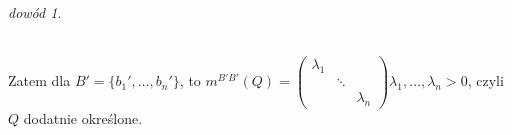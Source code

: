 \documentclass[10pt]{article}
\theoremstyle{definition}
\theoremstyle{definition}
\theoremstyle{definition}
\theoremstyle{definition}
\theoremstyle{remark}
\newtheorem*{dd}{dowód}
\theoremstyle{definition}
\theoremstyle{definition}
\theoremstyle{definition}
\theoremstyle{definition}
\theoremstyle{definition}
\begin{document}
\begin{dd}
\begin{itemize}
\begin{itemize}
                                    \\ Zatem dla $B' = \{b_1',\ldots,b_n'\}$, to 
                                    $m^{B'B'}(Q) = \begin{pmatrix} \lambda_1 & & 
                                    \\ & \ddots & \\ & & \lambda_n \end{pmatrix}
                                    \lambda_1,\ldots,\lambda_n > 0$, czyli $Q$ dodatnie
                                    określone. 
                            \end{itemize} 
    \end{itemize} 
\end{dd} 
\end{document}

